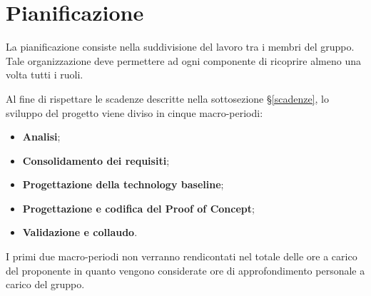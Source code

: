 \documentclass[../piano-di-progetto.tex]{subfiles}
\begin{document}
\section{Pianificazione}
\label{section:pian}

La pianificazione consiste nella suddivisione del lavoro tra i membri del gruppo. Tale organizzazione deve permettere ad ogni componente di ricoprire almeno una volta tutti i ruoli.

Al fine di rispettare le scadenze descritte nella sottosezione \S\ref{scadenze}, lo sviluppo del progetto viene diviso in cinque macro-periodi:
\begin{itemize}
    \item \textbf{Analisi};
    \item \textbf{Consolidamento dei requisiti};
    \item \textbf{Progettazione della technology baseline};
    \item \textbf{Progettazione e codifica del Proof of Concept};
    \item \textbf{Validazione e collaudo}.
\end{itemize}
I primi due macro-periodi non verranno rendicontati nel totale delle ore a carico del proponente in quanto vengono considerate ore di approfondimento personale a carico del gruppo.






\end{document}
